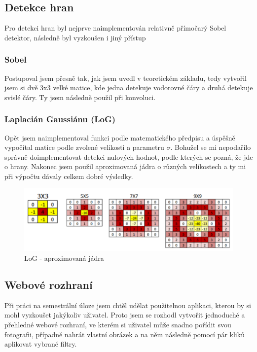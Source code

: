 \documentclass[11pt,oneside]{article}
\begin{document}
\subsection{Detekce hran}

Pro detekci hran byl nejprve naimplementován relativně přímočarý Sobel detektor, následně byl vyzkoušen i jiný přístup

\subsubsection{Sobel}

Postupoval jsem přesně tak, jak jsem uvedl v teoretickém základu, tedy vytvořil jsem si dvě 3x3 velké matice, kde jedna detekuje vodorovné čáry a druhá detekuje svislé čáry. Ty jsem následně použil při konvoluci.

\subsubsection{Laplacián Gaussiánu (LoG)}

Opět jsem naimplementoval funkci podle matematického předpisu a úspěšně vypočítal matice podle zvolené velikosti a parametru $\sigma$. Bohužel se mi nepodařilo správně doimplementovat detekci nulových hodnot, podle kterých se pozná, že jde o hrany. Nakonec jsem použil aproximovaná jádra o různých velikostech a ty mi při výpočtu dávaly celkem dobré výsledky.

\begin{figure}[!htb]
\centering
\includegraphics[width=1.0\textwidth]{log-kernel.png}
\caption{LoG - aproximovaná jádra}
\end{figure}

\subsection{Webové rozhraní}

Při práci na semestrální úloze jsem chtěl udělat použitelnou aplikaci, kterou by si mohl vyzkoušet jakýkoliv uživatel. Proto jsem se rozhodl vytvořit jednoduché a přehledné webové rozhraní, ve kterém si uživatel může snadno pořídit svou fotografii, případně nahrát vlastní obrázek a na něm následně pomocí pár kliků aplikovat vybrané filtry.
\end{document}
